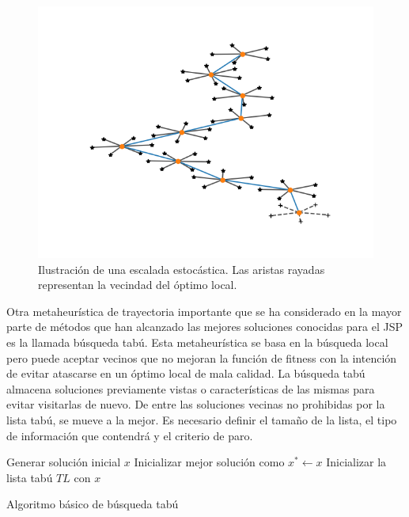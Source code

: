 \begin{figure}[H]
\centering
\includegraphics[scale=.7]{Imagenes/mettray.png}
    \caption{Ilustración de una escalada estocástica. Las aristas rayadas representan la vecindad del óptimo local.}
\end{figure}


Otra metaheurística de trayectoria importante que se ha considerado en la mayor parte de métodos que han alcanzado las mejores soluciones conocidas para el JSP es
la llamada búsqueda tabú. 
%
Esta metaheurística se basa en la búsqueda local pero puede aceptar vecinos que no mejoran la función de fitness con la intención de evitar atascarse en un óptimo 
local de mala calidad. 
%
La búsqueda tabú almacena soluciones previamente vistas o características de las mismas para evitar visitarlas de nuevo. 
%
De entre las soluciones vecinas no prohibidas por la lista tabú, se mueve a la mejor.
%
Es necesario definir el tamaño de la lista, el tipo de información que contendrá y el criterio de paro.

\begin{algorithm}[H]
 Generar solución inicial $x$\;
    Inicializar mejor solución como $x^*\leftarrow x$
 Inicializar la lista tabú $TL$ con $x$\; 
    \label{alg:TS}
    \caption{Algoritmo básico de búsqueda tabú}
\end{algorithm}

